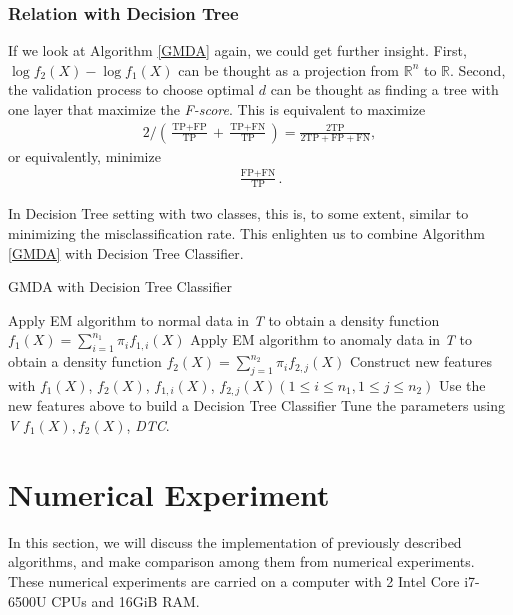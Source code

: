 \documentclass[english]{article}
\newenvironment{eqt}{\begin{equation}\begin{aligned}}{\end{aligned}\end{equation}}
\begin{document}
\subsubsection{Relation with Decision Tree}
\par

If we look at Algorithm \ref{GMDA} again, we could get further insight. First, $\log f_2(X) - \log f_1(X)$ can be thought as a projection from $\mathbb{R}^n$ to $\mathbb{R}$. Second, the validation process to choose optimal $d$ can be thought as finding a tree with one layer that maximize the \textit{F-score}. This is equivalent to maximize 
\begin{eqt}
2\bigg/\left(\frac{\text{TP}+\text{FP}}{\text{TP}}+\frac{\text{TP}+\text{FN}}{\text{TP}}\right) = \frac{2\text{TP}}{2\text{TP}+\text{FP}+\text{FN}},
\end{eqt}
or equivalently, minimize
\begin{eqt}
\frac{\text{FP} + \text{FN}}{\text{TP}}.
\end{eqt}
\par
In Decision Tree setting with two classes, this is, to some extent, similar to minimizing the misclassification rate. This enlighten us to combine Algorithm \ref{GMDA} with Decision Tree Classifier.

\begin{algorithm}[H]
\label{GMDA-DTC}
\caption{GMDA with Decision Tree Classifier}
\SetAlgoLined
		Apply EM algorithm to normal data in \textit{T} to obtain a density function $f_1(X) = \sum_{i=1}^{n_1}\pi_if_{1, i}(X)$\;
		Apply EM algorithm to anomaly data in \textit{T} to obtain a density function $f_2(X) = \sum_{j=1}^{n_2}\pi_if_{2, j}(X)$\;
		Construct new features with $f_1(X)$, $f_2(X)$, $f_{1, i}(X)$, $f_{2, j}(X)$$(1\leqslant i\leqslant n_1, 1\leqslant j\leqslant n_2)$\;
		Use the new features above to build a Decision Tree Classifier\;
		Tune the parameters using \textit{V}\;
		\Return $f_1(X), f_2(X)$, \textit{DTC}.
\end{algorithm}


\section{Numerical Experiment}
\par In this section, we will discuss the implementation of previously described algorithms, and make comparison among them from numerical experiments. These numerical experiments are carried on a computer with 2 Intel Core i7-6500U CPUs and 16GiB RAM.
\end{document}
